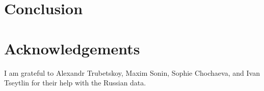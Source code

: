 \section{Conclusion \label{sec:conclusion}}

\section*{Acknowledgements}
I am grateful to Alexandr Trubetskoy, Maxim Sonin, Sophie Chochaeva, and Ivan Tseytlin for their help with the Russian data.

